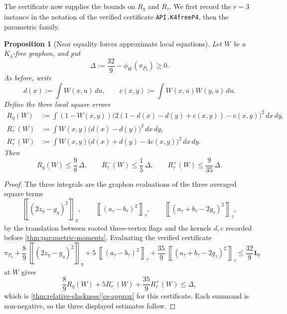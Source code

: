 \documentclass[11pt]{article}
\newtheorem{proposition}[proposition]{Proposition}
\theoremstyle{definition}
\newcommand{\avg}[2]{\left\llbracket #1 \right\rrbracket_{#2}}
\newcommand{\one}{\mathbf 1}
\begin{document}
The certificate now supplies the bounds on $R_\eta$ and $R_\tau$.  We first record the
$r=3$ instance in the notation of the verified certificate \texttt{API.K4freeP4}, then
the parametric family.

\begin{proposition}[Near equality forces approximate local equations]
\label{prop:k4free-p4-certificate-stability}
Let $W$ be a $K_4$-free graphon, and put
\[
  \Delta:=\frac{32}{9}-\phi_W(\pi_{P_4})\ge0 .
\]
As before, write
\[
  d(x):=\int W(x,u)\,du,\qquad
  c(x,y):=\int W(x,u)W(y,u)\,du .
\]
Define the three local square errors
\[
\begin{aligned}
  R_\eta(W)
    &:=\int (1-W(x,y))
      \bigl(2(1-d(x)-d(y)+c(x,y))-c(x,y)\bigr)^2\,dx\,dy,\\
  R_\tau^{-}(W)
    &:=\int W(x,y)\bigl(d(x)-d(y)\bigr)^2\,dx\,dy,\\
  R_\tau^{+}(W)
    &:=\int W(x,y)\bigl(d(x)+d(y)-4c(x,y)\bigr)^2\,dx\,dy .
\end{aligned}
\]
Then
\[
  R_\eta(W)\le\frac98\,\Delta,\qquad
  R_\tau^{-}(W)\le\frac15\,\Delta,\qquad
  R_\tau^{+}(W)\le\frac9{35}\,\Delta .
\]
\end{proposition}

\begin{proof}
The three integrals are the graphon evaluations of the three averaged square terms
\[
  \avg{(2z_\eta-g_\eta)^2}{\eta},\qquad
  \avg{(a_\tau-b_\tau)^2}{\tau},\qquad
  \avg{(a_\tau+b_\tau-2g_\tau)^2}{\tau},
\]
by the translation between rooted three-vertex flags and the kernels $d,c$ recorded
before \cref{thm:parametric-moments}.  Evaluating the verified certificate
\[
  \pi_{P_4}
  +\frac89\,\avg{(2z_\eta-g_\eta)^2}{\eta}
  +5\,\avg{(a_\tau-b_\tau)^2}{\tau}
  +\frac{35}{9}\,\avg{(a_\tau+b_\tau-2g_\tau)^2}{\tau}
  \le \frac{32}{9}\one_0
\]
at $W$ gives
\[
  \frac89 R_\eta(W)+5R_\tau^{-}(W)+\frac{35}{9}R_\tau^{+}(W)\le\Delta ,
\]
which is \cref{thm:relative-slackness}\ref{cs-approx} for this certificate.  Each
summand is non-negative, so the three displayed estimates follow.
\end{proof}
\end{document}
